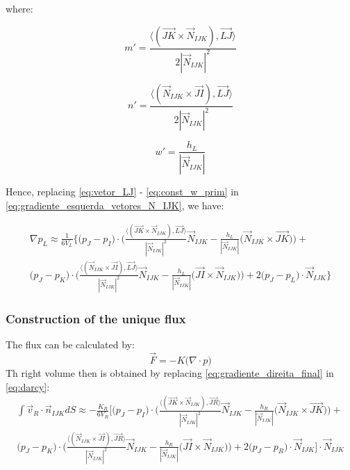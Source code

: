 \documentclass{article}
\begin{document}
where:

\begin{equation} \label{eq:const_m_prim}
m' = \frac{\langle(\vec{JK} \times \vec{N}_{IJK}), \vec{LJ}\rangle}{2 |\vec{N}_{IJK}|^2} 
\end{equation}

\begin{equation} \label{eq:const_n_prim}
n' = \frac{\langle(\vec{N}_{IJK} \times \vec{JI}), \vec{LJ}\rangle}{2 |\vec{N}_{IJK}|^2}
\end{equation}

\begin{equation} \label{eq:const_w_prim}
w' = \frac{h_{L}}{|\vec{N}_{IJK}|} 
\end{equation}

Hence, replacing \ref{eq:vetor_LJ} - \ref{eq:const_w_prim} in \ref{eq:gradiente_esquerda_vetores_N_IJK}, we have:

\begin{equation} \label{eq:gradiente_esquerda_final}
\begin{split}
\nabla p_{L} \approx \frac{1}{6V_{L}}\Bigg\{ \big(p_{J} - p_{I}\big) \cdot \Bigg(\frac{\langle(\vec{JK} \times \vec{N}_{IJK}), \vec{LJ}\rangle}{|\vec{N}_{IJK}|^2}\vec{N}_{IJK} - \frac{h_{L}}{|\vec{N}_{IJK}|} \Big( \vec{N}_{IJK} \times \vec{JK} \Big) \Bigg)  + \\
 \big( p_{J} -  p_{K}\big) \cdot   \Bigg( \frac{\langle(\vec{N}_{IJK} \times \vec{JI}), \vec{LJ}\rangle}{|\vec{N}_{IJK}|^2}\vec{N}_{IJK} - \frac{h_{L}}{|\vec{N}_{IJK}|} \Big( \vec{JI} \times \vec{N}_{IJK} \Big) \Bigg) + 2\big( p_{J} - p_{L}\big) \cdot  \vec{N}_{IJK}\Bigg\}
\end{split}
\end{equation}
		\subsubsection{Construction of the unique flux}
The flux can be calculated by:
\begin{equation} \label{eq:darcy}
\vec{F} = - K \big( \nabla \cdot p \big)
\end{equation}
Th right volume then is obtained by replacing \ref{eq:gradiente_direita_final} in \ref{eq:darcy}:
\begin{equation} \label{eq:fluxo_direita}
\begin{split}
\int{\vec{v}_{R} \cdot \vec{n}_{IJK}dS} 
 \approx -\frac{K_{R}}{6V_{R}} \Bigg[ \big( p_{J} - p_{I}\big) \cdot  \Bigg( \frac{\langle(\vec{JK} \times \vec{N}_{IJK}), \vec{JR}\rangle}{|\vec{N}_{IJK}| ^2} \vec{N}_{IJK} - \frac{h_{R}}{|\vec{N}_{IJK}|} \Big(\vec{N}_{IJK}\times \vec{JK} \Big)\Bigg)  + \\
\big( p_{J} - p_{K} \big) \cdot  \Bigg(\frac{\langle(\vec{N}_{IJK} \times \vec{JI}), \vec{JR}\rangle}{|\vec{N}_{IJK}| ^ 2}\vec{N}_{IJK} - \frac{h_{R}}{|\vec{N}_{IJK}|} \Big( \vec{JI} \times \vec{N}_{IJK}\Big) \Bigg) + 2 \big(p_{J} - p_{R}\big) \cdot \vec{N}_{IJK} \Bigg] \cdot \vec{N}_{IJK}
\end{split}
\end{equation}
\end{document}
